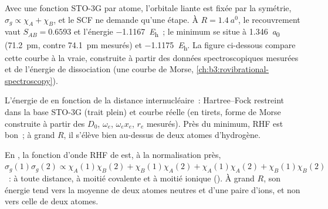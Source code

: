 \begin{example}\label{ex:b3:computational-chemistry:h2}
Avec une fonction STO-3G par atome, l'orbitale liante est fixée par la
symétrie,
$\sigma_g \propto \chi_A + \chi_B$, et le SCF ne demande qu'une étape. À $R =
\qty{1.4}{\bohr}$, le recouvrement vaut $S_{AB} = 0.6593$ et l'énergie
\qty{-1.1167}{\hartree}~; le minimum se situe à \qty{1.346}{\bohr}
(\qty{71.2}{pm},
contre \qty{74.1}{pm} mesurés) et \qty{-1.1175}{\hartree}. La figure
ci-dessous compare cette courbe à la vraie, construite à partir des
données spectroscopiques mesurées et de l'énergie de dissociation (une
courbe de Morse, \cref{ch:b3:rovibrational-spectroscopy}).
\end{example}

\begin{omfigure}

{\small L'énergie de  en fonction de la distance internucléaire~:
Hartree--Fock restreint dans la base STO-3G (trait plein) et courbe
réelle (en tirets, forme de Morse construite à partir des $D_0$,
$\omega_e$, $\omega_ex_e$, $r_e$ mesurés). Près du
minimum, RHF est bon~; à grand $R$, il s'élève bien au-dessus de deux
atomes d'hydrogène.}
\end{omfigure}

\begin{proposition}\label{prop:b3:computational-chemistry:rhf-dissociation}
En , la fonction d'onde RHF de  est, à la
normalisation près, $\sigma_g(1)\sigma_g(2) \propto \chi_A(1)\chi_B(2) + \chi_B(1)\chi_A(2)
+ \chi_A(1)\chi_A(2) + \chi_B(1)\chi_B(2)$~: à toute distance, à moitié
covalente et à moitié ionique (). À grand $R$, son énergie
tend vers la moyenne de deux atomes neutres et d'une paire d'ions, et
non vers celle de deux atomes.
\end{proposition}

